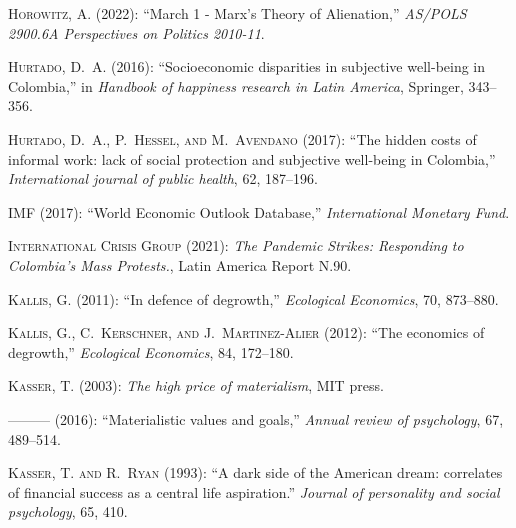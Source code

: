 \documentclass[10pt, letterpaper]{article}
\begin{document}
\begin{spacing}{2}
\begin{thebibliography}{120}
\textsc{Horowitz, A.} (2022): \enquote{March 1 - Marx's Theory of Alienation,}
  \emph{AS/POLS 2900.6A Perspectives on Politics 2010-11}.

\textsc{Hurtado, D.~A.} (2016): \enquote{Socioeconomic disparities in
  subjective well-being in Colombia,} in \emph{Handbook of happiness research
  in Latin America}, Springer, 343--356.

\textsc{Hurtado, D.~A., P.~Hessel, and M.~Avendano} (2017): \enquote{The hidden
  costs of informal work: lack of social protection and subjective well-being
  in Colombia,} \emph{International journal of public health}, 62, 187--196.

\textsc{IMF} (2017): \enquote{World Economic Outlook Database,}
  \emph{International Monetary Fund}.

\textsc{{International Crisis Group}} (2021): \emph{The Pandemic Strikes:
  Responding to Colombia's Mass Protests.}, Latin America Report N.90.

\textsc{Kallis, G.} (2011): \enquote{In defence of degrowth,} \emph{Ecological
  Economics}, 70, 873--880.

\textsc{Kallis, G., C.~Kerschner, and J.~Martinez-Alier} (2012): \enquote{The
  economics of degrowth,} \emph{Ecological Economics}, 84, 172--180.

\textsc{Kasser, T.} (2003): \emph{The high price of materialism}, MIT press.

---\hspace{-.1pt}---\hspace{-.1pt}--- (2016): \enquote{Materialistic values and
  goals,} \emph{Annual review of psychology}, 67, 489--514.

\textsc{Kasser, T. and R.~Ryan} (1993): \enquote{A dark side of the American
  dream: correlates of financial success as a central life aspiration.}
  \emph{Journal of personality and social psychology}, 65, 410.


\end{thebibliography}
\end{spacing}
\end{document}

